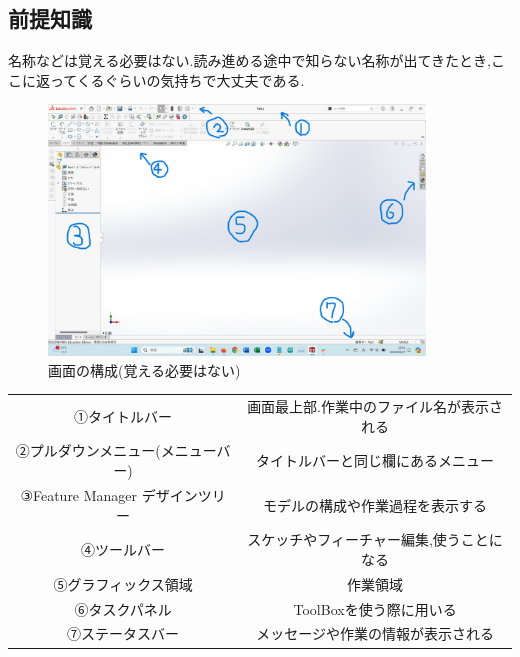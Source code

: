 \documentclass[a4paper,11pt]{jsarticle}
\begin{document}
\subsection{前提知識}
名称などは覚える必要はない.読み進める途中で知らない名称が出てきたとき,ここに返ってくるぐらいの気持ちで大丈夫である.
\begin{figure}[h]
 \begin{center}
  \includegraphics[width=100mm]{solidworks_menu1.png}
  \caption{画面の構成(覚える必要はない)}
 \end{center}
\end{figure}
\begin{table}[h]
\centering
\begin{tabular}[t]{|c|c|}
 ①タイトルバー & 画面最上部.作業中のファイル名が表示される \\
 ②プルダウンメニュー(メニューバー) & タイトルバーと同じ欄にあるメニュー \\
 ③Feature Manager デザインツリー & モデルの構成や作業過程を表示する \\
 ④ツールバー & スケッチやフィーチャー編集,使うことになる \\
 ⑤グラフィックス領域 & 作業領域\\
 ⑥タスクパネル & ToolBoxを使う際に用いる \\
 ⑦ステータスバー & メッセージや作業の情報が表示される \\
\end{tabular}
\end{table}
\end{document}
